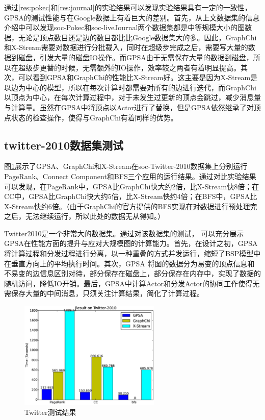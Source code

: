 通过\ref{res:pokec}和\ref{res:journal}的实验结果可以发现实验结果具有一定的一致性，GPSA的测试性能与在Google数据上有着巨大的差别。首先，从上文数据集的信息介绍中可以发现soc-Pokec和soc-liveJournal两个数据集都是中等规模大小的图数据，无论是顶点数目还是边的数目都比比Google数据集大的多。因此，GraphChi和X-Stream需要对数据进行分批载入，同时在超级步完成之后，需要写大量的数据到磁盘，引发大量的磁盘IO操作。而GPSA由于无需保存大量的数据到磁盘，所以在超级步更替的时候，无需额外的IO操作，效率较之两者有着明显提高。其次，可以看到GPSA和GraphChi的性能比X-Stream好。这主要是因为X-Stream是以边为中心的模型，所以在每次计算时都需要对所有的边进行迭代，而GraphChi以顶点为中心，在每次计算过程中，对于未发生过更新的顶点会跳过，减少消息量与计算量。虽然在GPSA中将顶点以Actor进行了替换，但是GPSA依然继承了对顶点状态的检查操作，使得与GraphChi有着同样的优势。

\subsection{twitter-2010数据集测试}
图\ref{res:twitter}展示了GPSA、GraphChi和X-Stream在soc-Twitter-2010数据集上分别运行PageRank、Connect Component和BFS三个应用的运行结果。通过对比实验结果可以发现，在PageRank中，GPSA比GraphChi快大约2倍，比X-Stream快8倍；在CC中，GPSA比GraphChi快大约5倍，比X-Stream快约4倍；在BFS中，GPSA比X-Stream快约6倍。（由于GraphChi的官方提供的BFS实现在对数据进行预处理完之后，无法继续运行，所以此处的数据无从得知。）

Twitter2010是一个非常大的数据集。通过对该数据集的测试，
可以充分展示GPSA在性能方面的提升与应对大规模图的计算能力。首先，在设计之初，GPSA将计算过程和分发过程进行分离，以一种重叠的方式并发运行，缩短了BSP模型中在垂直方向上的平均执行时间。其次，GPSA 将图的数据分为易变的顶点信息和不易变的边信息区别对待，部分保存在磁盘上，部分保存在内存中，实现了数据的随机访问，降低IO开销。最后，GPSA中计算Actor和分发Actor的协同工作使得无需保存大量的中间消息，只须关注计算结果，简化了计算过程。

\begin{figure}[htbp]
\centering
\includegraphics[width=0.6\textwidth,scale=0.8]{myfigures/twittertime2.eps}
\caption{Twitter测试结果}
\label{res:twitter}
\end{figure}


